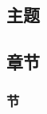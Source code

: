 \documentclass[12pt]{book}
\title{}%
\author{}
\date{2016.9-2016.12}
\begin{document}
\begin{CJK*}{UTF8}{gbsn}%
\maketitle
\thispagestyle{empty} %
\newpage

\setcounter{page}{1}


\newpage

\tableofcontents
\newpage

\setcounter{page}{1}

\part{主题}
\chapter{章节}
\section{节}


\newpage  %
\end{CJK*}%
\end{document}
